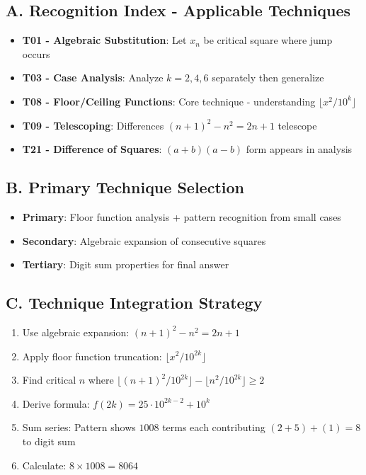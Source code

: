 \documentclass[]{article}
\begin{document}
\begin{techniquesbox}
\subsection*{A. Recognition Index - Applicable Techniques}
\begin{itemize}[leftmargin=*]
    \item \textbf{T01 - Algebraic Substitution}: Let $x_n$ be critical square where jump occurs
    \item \textbf{T03 - Case Analysis}: Analyze $k=2,4,6$ separately then generalize
    \item \textbf{T08 - Floor/Ceiling Functions}: Core technique - understanding $\lfloor x^2/10^k \rfloor$
    \item \textbf{T09 - Telescoping}: Differences $(n+1)^2 - n^2 = 2n+1$ telescope
    \item \textbf{T21 - Difference of Squares}: $(a+b)(a-b)$ form appears in analysis
\end{itemize}

\subsection*{B. Primary Technique Selection}
\begin{itemize}[leftmargin=*]
    \item \textbf{Primary}: Floor function analysis + pattern recognition from small cases
    \item \textbf{Secondary}: Algebraic expansion of consecutive squares
    \item \textbf{Tertiary}: Digit sum properties for final answer
\end{itemize}

\subsection*{C. Technique Integration Strategy}
\begin{enumerate}[leftmargin=*]
    \item Use algebraic expansion: $(n+1)^2 - n^2 = 2n + 1$
    \item Apply floor function truncation: $\lfloor x^2/10^{2k} \rfloor$
    \item Find critical $n$ where $\lfloor (n+1)^2/10^{2k} \rfloor - \lfloor n^2/10^{2k} \rfloor \geq 2$
    \item Derive formula: $f(2k) = 25 \cdot 10^{2k-2} + 10^k$
    \item Sum series: Pattern shows $1008$ terms each contributing $(2+5)+(1) = 8$ to digit sum
    \item Calculate: $8 \times 1008 = 8064$
\end{enumerate}


\end{techniquesbox}
\end{document}
